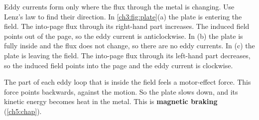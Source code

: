 Eddy currents form only where the flux through the metal is changing. Use Lenz's
law to find their direction. In \cref{ch3:fig:plate}(a) the plate is entering
the field. The into-page flux through its right-hand part increases. The induced
field points out of the page, so the eddy current is anticlockwise. In (b) the
plate is fully inside and the flux does not change, so there are no eddy
currents. In (c) the plate is leaving the field. The into-page flux through its
left-hand part decreases, so the induced field points into the page and the eddy
current is clockwise.

The part of each eddy loop that is inside the field feels a motor-effect force.
This force points backwards, against the motion. So the plate slows down, and its
kinetic energy becomes heat in the metal. This is \textbf{magnetic braking}
(\cref{ch5:chap}).

